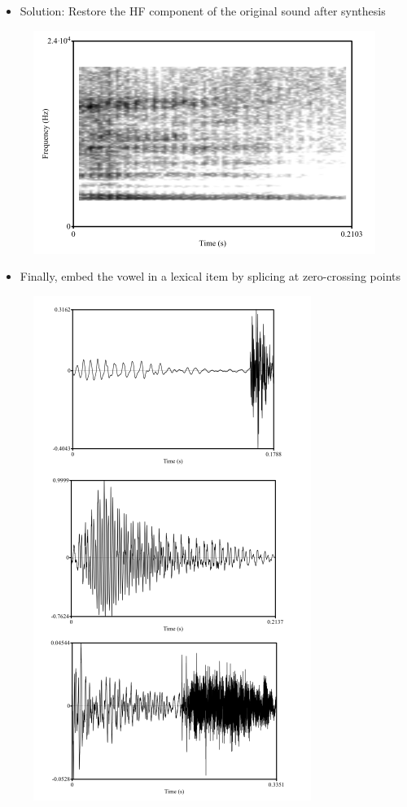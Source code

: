\documentclass{beamer}
\begin{document}
\begin{frame}
\begin{itemize}
\item{Solution: Restore the HF component of the original sound after synthesis}
\end{itemize}
\begin{figure}
\includegraphics[scale=0.5,keepaspectratio]{synth_HF_added.png}
\end{figure}
\end{frame}
\begin{frame}
\begin{itemize}
\item{Finally, embed the vowel in a lexical item by splicing at zero-crossing points}
\end{itemize}
\begin{figure}
\includegraphics[scale=0.3,keepaspectratio]{concat.png}
\end{figure}
\end{frame}
\end{document}
